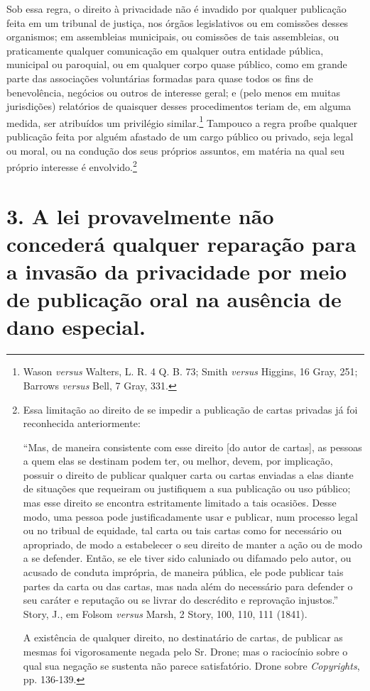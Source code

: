 Sob essa regra, o direito à privacidade não é invadido por qualquer
publicação feita em um tribunal de justiça, nos órgãos legislativos ou
em comissões desses organismos; em assembleias municipais, ou comissões
de tais assembleias, ou praticamente qualquer comunicação em qualquer
outra entidade pública, municipal ou paroquial, ou em qualquer corpo
quase público, como em grande parte das associações voluntárias formadas
para quase todos os fins de benevolência, negócios ou outros de
interesse geral; e (pelo menos em muitas jurisdições) relatórios de
quaisquer desses procedimentos teriam de, em alguma medida, ser
atribuídos um privilégio similar.\footnote{Wason \emph{versus} Walters,
  L. R. 4 Q. B. 73; Smith \emph{versus} Higgins, 16 Gray, 251; Barrows
  \emph{versus} Bell, 7 Gray, 331.} Tampouco a regra proíbe qualquer
publicação feita por alguém afastado de um cargo público ou privado,
seja legal ou moral, ou na condução dos seus próprios assuntos, em
matéria na qual seu próprio interesse é envolvido.\footnote{Essa
  limitação ao direito de se impedir a publicação de cartas privadas já
  foi reconhecida anteriormente:

  ``Mas, de maneira consistente com esse direito {[}do autor de
  cartas{]}, as pessoas a quem elas se destinam podem ter, ou melhor,
  devem, por implicação, possuir o direito de publicar qualquer carta ou
  cartas enviadas a elas diante de situações que requeiram ou
  justifiquem a sua publicação ou uso público; mas esse direito se
  encontra estritamente limitado a tais ocasiões. Desse modo, uma pessoa
  pode justificadamente usar e publicar, num processo legal ou no
  tribual de equidade, tal carta ou tais cartas como for necessário ou
  apropriado, de modo a estabelecer o seu direito de manter a ação ou de
  modo a se defender. Então, se ele tiver sido caluniado ou difamado
  pelo autor, ou acusado de conduta imprópria, de maneira pública, ele
  pode publicar tais partes da carta ou das cartas, mas nada além do
  necessário para defender o seu caráter e reputação ou se livrar do
  descrédito e reprovação injustos.'' Story, J., em Folsom \emph{versus}
  Marsh, 2 Story, 100, 110, 111 (1841).

  A existência de qualquer direito, no destinatário de cartas, de
  publicar as mesmas foi vigorosamente negada pelo Sr. Drone; mas o
  raciocínio sobre o qual sua negação se sustenta não parece
  satisfatório. Drone sobre \emph{Copyrights}, pp. 136-139.}

\section{3. A lei provavelmente não concederá qualquer reparação para a
invasão da privacidade por meio de publicação oral na ausência de dano
especial.}

